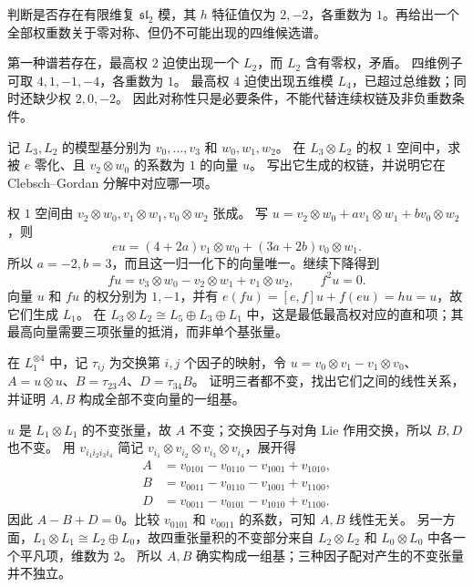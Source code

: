 \begin{exercise}\label{b5:ex:14-impossible-weights}
	判断是否存在有限维复 \(\mathfrak{sl}_2\) 模，其 \(h\) 特征值仅为 \(2,-2\)，各重数为 \(1\)。再给出一个全部权重数关于零对称、但仍不可能出现的四维候选谱。
\end{exercise}
\begin{solution}
	第一种谱若存在，最高权 \(2\) 迫使出现一个 \(L_2\)，而 \(L_2\) 含有零权，矛盾。 四维例子可取 \(4,1,-1,-4\)，各重数为 \(1\)。 最高权 \(4\) 迫使出现五维模 \(L_4\)，已超过总维数；同时还缺少权 \(2,0,-2\)。 因此对称性只是必要条件，不能代替连续权链及非负重数条件。
\end{solution}

\begin{exercise}\label{b5:ex:14-tensor-highest}
	记 \(L_3,L_2\) 的模型基分别为 \(v_0,\ldots,v_3\) 和 \(w_0,w_1,w_2\)。 在 \(L_3\otimes L_2\) 的权 \(1\) 空间中，求被 \(e\) 零化、且 \(v_2\otimes w_0\) 的系数为 \(1\) 的向量 \(u\)。 写出它生成的权链，并说明它在 Clebsch--Gordan 分解中对应哪一项。
\end{exercise}
\begin{solution}
	权 \(1\) 空间由 \(v_2\otimes w_0,v_1\otimes w_1,v_0\otimes w_2\) 张成。 写 \(u=v_2\otimes w_0+a v_1\otimes w_1+b v_0\otimes w_2\)，则
	\[
		eu=(4+2a)v_1\otimes w_0+(3a+2b)v_0\otimes w_1.
	\]
	所以 \(a=-2,b=3\)，而且这一归一化下的向量唯一。继续下降得到
	\[
		fu=v_3\otimes w_0-v_2\otimes w_1+v_1\otimes w_2,\qquad f^2u=0.
	\]
	向量 \(u\) 和 \(fu\) 的权分别为 \(1,-1\)，并有 \(e(fu)=[e,f]u+f(eu)=hu=u\)，故它们生成 \(L_1\)。 在 \(L_3\otimes L_2\cong L_5\oplus L_3\oplus L_1\) 中，这是最低最高权对应的直和项；其最高向量需要三项张量的抵消，而非单个基张量。
\end{solution}

\begin{exercise}\label{b5:ex:14-tensor-invariant}
	在 \(L_1^{\otimes4}\) 中，记 \(\tau_{ij}\) 为交换第 \(i,j\) 个因子的映射，令 \(u=v_0\otimes v_1-v_1\otimes v_0\)、 \(A=u\otimes u\)、\(B=\tau_{23}A\)、\(D=\tau_{34}B\)。 证明三者都不变，找出它们之间的线性关系，并证明 \(A,B\) 构成全部不变向量的一组基。
\end{exercise}
\begin{solution}
	\(u\) 是 \(L_1\otimes L_1\) 的不变张量，故 \(A\) 不变；交换因子与对角 Lie 作用交换，所以 \(B,D\) 也不变。 用 \(v_{i_1i_2i_3i_4}\) 简记 \(v_{i_1}\otimes v_{i_2}\otimes v_{i_3}\otimes v_{i_4}\)，展开得
	\[
		\begin{aligned}
			A&=v_{0101}-v_{0110}-v_{1001}+v_{1010},\\
			B&=v_{0011}-v_{0110}-v_{1001}+v_{1100},\\
			D&=v_{0011}-v_{0101}-v_{1010}+v_{1100}.
		\end{aligned}
	\]
	因此 \(A-B+D=0\)。比较 \(v_{0101}\) 和 \(v_{0011}\) 的系数，可知 \(A,B\) 线性无关。 另一方面，\(L_1\otimes L_1\cong L_2\oplus L_0\)，故四重张量积的不变部分来自 \(L_2\otimes L_2\) 和 \(L_0\otimes L_0\) 中各一个平凡项，维数为 \(2\)。 所以 \(A,B\) 确实构成一组基；三种因子配对产生的不变张量并不独立。
\end{solution}

